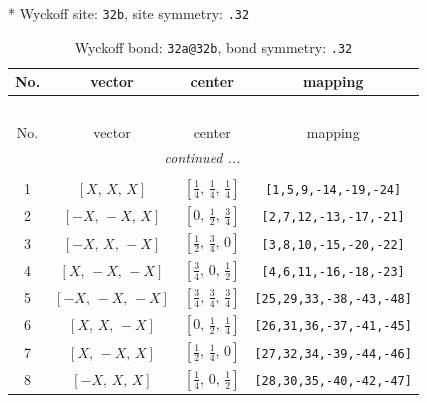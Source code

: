 \documentclass[fleqn,8pt]{jsarticle}
\begin{document}
* Wyckoff site: {\tt 32b}, site symmetry: {\tt .32}
\renewcommand{\arraystretch}{1.2}
\begin{longtable}{cccc}
\caption{Wyckoff bond: {\tt 32a@32b}, bond symmetry: {\tt .32}}
 \\
 \hline \hline
No. & vector & center & mapping \\ \hline \endfirsthead

\multicolumn{3}{l}{\tablename\ \thetable{}} \\
 \hline \hline
No. & vector & center & mapping \\ \hline \endhead

 \hline \hline
\multicolumn{3}{r}{\footnotesize\it continued ...} \\ \endfoot

 \hline \hline
\multicolumn{3}{r}{} \\ \endlastfoot

1 & $\left[ X,\, X,\, X \right]$ & $\left[ \frac{1}{4},\, \frac{1}{4},\, \frac{1}{4} \right]$ & {\tt [1,5,9,-14,-19,-24]} \\ \hline
2 & $\left[ - X,\, - X,\, X \right]$ & $\left[ 0,\, \frac{1}{2},\, \frac{3}{4} \right]$ & {\tt [2,7,12,-13,-17,-21]} \\ \hline
3 & $\left[ - X,\, X,\, - X \right]$ & $\left[ \frac{1}{2},\, \frac{3}{4},\, 0 \right]$ & {\tt [3,8,10,-15,-20,-22]} \\ \hline
4 & $\left[ X,\, - X,\, - X \right]$ & $\left[ \frac{3}{4},\, 0,\, \frac{1}{2} \right]$ & {\tt [4,6,11,-16,-18,-23]} \\ \hline
5 & $\left[ - X,\, - X,\, - X \right]$ & $\left[ \frac{3}{4},\, \frac{3}{4},\, \frac{3}{4} \right]$ & {\tt [25,29,33,-38,-43,-48]} \\ \hline
6 & $\left[ X,\, X,\, - X \right]$ & $\left[ 0,\, \frac{1}{2},\, \frac{1}{4} \right]$ & {\tt [26,31,36,-37,-41,-45]} \\ \hline
7 & $\left[ X,\, - X,\, X \right]$ & $\left[ \frac{1}{2},\, \frac{1}{4},\, 0 \right]$ & {\tt [27,32,34,-39,-44,-46]} \\ \hline
8 & $\left[ - X,\, X,\, X \right]$ & $\left[ \frac{1}{4},\, 0,\, \frac{1}{2} \right]$ & {\tt [28,30,35,-40,-42,-47]} \\
\end{longtable}
\renewcommand{\arraystretch}{1.2}
\end{document}
